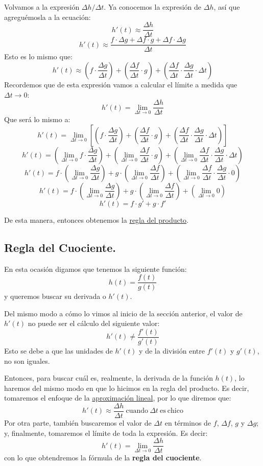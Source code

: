 \documentclass[12pt]{article}
\begin{document}
Volvamos a la expresión $\Delta h / \Delta t$. Ya conocemos la expresión de $\Delta h$, así que agreguémosla a la ecuación:
\[h'(t) \approx \frac{\Delta h}{\Delta t}\]
\[h'(t) \approx \frac{f \cdot \Delta g + \Delta f \cdot g + \Delta f \cdot \Delta g}{\Delta t}\]
Esto es lo mismo que:
\[h'(t) \approx \left(f \cdot \frac{\Delta g}{\Delta t}\right) + \left(\frac{\Delta f}{\Delta t} \cdot g\right) + \left(\frac{\Delta f}{\Delta t} \cdot \frac{\Delta g}{\Delta t} \cdot \Delta t\right)\]
Recordemos que de esta expresión vamos a calcular el límite a medida que $\Delta t \to 0$:
\[h'(t) = \lim_{\Delta t \to 0} \frac{\Delta h}{\Delta t}\]
Que será lo mismo a:
\[h'(t) = \lim_{\Delta t \to 0} \left[\left(f \cdot \frac{\Delta g}{\Delta t}\right) + \left(\frac{\Delta f}{\Delta t} \cdot g\right) + \left(\frac{\Delta f}{\Delta t} \cdot \frac{\Delta g}{\Delta t} \cdot \Delta t\right)\right]\]
\[h'(t) = \left(\lim_{\Delta t \to 0} f \cdot \frac{\Delta g}{\Delta t}\right) + \left(\lim_{\Delta t \to 0} \frac{\Delta f}{\Delta t} \cdot g\right) + \left(\lim_{\Delta t \to 0} \frac{\Delta f}{\Delta t} \cdot \frac{\Delta g}{\Delta t} \cdot \Delta t\right)\]
\[h'(t) = f \cdot \left(\lim_{\Delta t \to 0} \frac{\Delta g}{\Delta t}\right) + g \cdot \left(\lim_{\Delta t \to 0} \frac{\Delta f}{\Delta t}\right) + \left(\lim_{\Delta t \to 0} \frac{\Delta f}{\Delta t} \cdot \frac{\Delta g}{\Delta t} \cdot 0\right)\]
\[h'(t) = f \cdot \left(\lim_{\Delta t \to 0} \frac{\Delta g}{\Delta t}\right) + g \cdot \left(\lim_{\Delta t \to 0} \frac{\Delta f}{\Delta t}\right) + \left(\lim_{\Delta t \to 0} 0\right)\]
\[h'(t) = f \cdot g' + g \cdot f'\]

De esta manera, entonces obtenemos la \underline{regla del producto}.




\subsection{Regla del Cuociente.}

En esta ocasión digamos que tenemos la siguiente función:
\[h(t) = \frac{f(t)}{g(t)}\]
y queremos buscar su derivada o $h'(t)$.

Del mismo modo a cómo lo vimos al inicio de la sección anterior, el valor de $h'(t)$ no puede ser el cálculo del siguiente valor:
\[h'(t) \neq \frac{f'(t)}{g'(t)}\]
Esto se debe a que las unidades de $h'(t)$ y de la división entre $f'(t)$ y $g'(t)$, no son iguales.

Entonces, para buscar cuál es, realmente, la derivada de la función $h(t)$, lo haremos del mismo modo en que lo hicimos en la regla del producto. Es decir, tomaremos el enfoque de la \underline{aproximación lineal}, por lo que diremos que:
\[h'(t) \approx \frac{\Delta h}{\Delta t} \ \mathrm{cuando} \ \Delta t \ \mathrm{es \ chico}\]
Por otra parte, también buscaremos el valor de $\Delta t$ en términos de $f$, $\Delta f$, $g$ y $\Delta g$; y, finalmente, tomaremos el límite de toda la expresión. Es decir:
\[h'(t) = \lim_{\Delta t \to 0} \frac{\Delta h}{\Delta t}\]
con lo que obtendremos la fórmula de la \textbf{regla del cuociente}.
\end{document}

